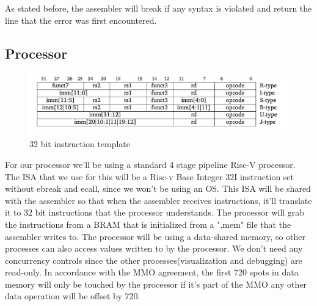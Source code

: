 \documentclass[conference]{IEEEtran}
\begin{document}
As stated before, the assembler will break if any syntax is violated and return the line that the error was first encountered. 


\subsection{Processor}
\begin{figure}
    \centering
    \includegraphics[width=1\linewidth]{Riscv instruction type .png}
    \caption{32 bit instruction template}
    \label{fig:enter-label}
\end{figure}

For our processor we'll be using a standard 4 stage pipeline Risc-V processor. The ISA that we use for this will be a Risc-v Base Integer 32I instruction set without ebreak and ecall, since we won't be using an OS. This ISA will be shared with the assembler so that when the assembler receives instructions, it'll translate it to 32 bit instructions that the processor understands. The processor will grab the instructions from a BRAM that is initialized from a ".mem" file that the assembler writes to. The processor will be using a data-shared memory, so other processes can also access values written to by the processor. We don't need any concurrency controls since the other processes(visualization and debugging) are read-only. In accordance with the MMO agreement, the first 720 spots in data memory will only be touched by the processor if it's part of the MMO any other data operation will be offset by 720. 
\end{document}
